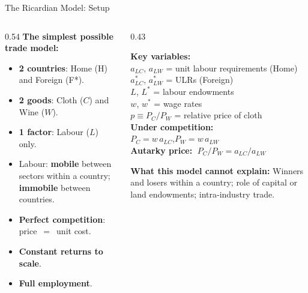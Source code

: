 \documentclass[aspectratio=169]{beamer}
\begin{document}

\begin{frame}{The Ricardian Model: Setup}
\begin{columns}[T]
\begin{column}{0.54\textwidth}
\textbf{The simplest possible trade model:}
\begin{itemize}\small
  \item \textbf{2 countries}: Home (H) and Foreign (F*).
  \item \textbf{2 goods}: Cloth ($C$) and Wine ($W$).
  \item \textbf{1 factor}: Labour ($L$) only.
  \item Labour: \textbf{mobile} between sectors within
        a country; \textbf{immobile} between countries.
  \item \textbf{Perfect competition}: price~$=$~unit cost.
  \item \textbf{Constant returns to scale}.
  \item \textbf{Full employment}.
\end{itemize}
\end{column}
\begin{column}{0.43\textwidth}
\begin{varbox}
\small\textbf{Key variables:}\\[0.2em]
$a_{LC}$, $a_{LW}$ = unit labour requirements (Home)\\
$a_{LC}^{*}$, $a_{LW}^{*}$ = ULRs (Foreign)\\
$L$, $L^{*}$ = labour endowments\\
$w$, $w^{*}$ = wage rates\\
$p \equiv P_C/P_W$ = relative price of cloth\\[0.3em]
\textbf{Under competition:}\\
$P_C = w\,a_{LC}$,\quad $P_W = w\,a_{LW}$\\[0.2em]
\textbf{Autarky price:}
$\;P_C/P_W = a_{LC}/a_{LW}$
\end{varbox}
\vspace{0.3em}
\begin{varbox}
\footnotesize\textbf{What this model cannot explain:}
Winners and losers within a country; role of capital
or land endowments; intra-industry trade.
\end{varbox}
\end{column}
\end{columns}
\end{frame}
\end{document}

